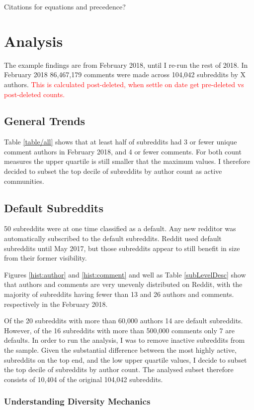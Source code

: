 \documentclass{article}
\begin{document}
Citations for equations and precedence?


\section{Analysis}

The example findings are from February 2018, until I re-run the rest of 2018. In February 2018 86,467,179 comments were made across 104,042 subreddits by X authors. \textcolor{red}{This is calculated post-deleted, when settle on date get pre-deleted vs post-deleted counts.}

\subsection{General Trends}

Table \ref{table/all} shows that at least half of subreddits had 3 or fewer unique comment authors in February 2018, and 4 or fewer comments. For both count measures the upper quartile is still smaller that the maximum values. I therefore decided to subset the top decile of subreddits by author count as active communities.


\subsection{Default Subreddits}
50 subreddits were at one time classified as a default. Any new redditor was automatically subscribed to the default subreddits. Reddit used default subreddits until May 2017, but those subreddits appear to still benefit in size from their former visibility.

Figures \ref{hist:author} and  \ref{hist:comment} and well as Table \ref{subLevelDesc} show that authors and comments are very unevenly distributed on Reddit, with the majority of subreddits having fewer than 13 and 26 authors and comments. respectively in the February 2018.

Of the 20 subreddits with more than 60,000 authors 14 are default subreddits. However, of the 16 subreddits with more than 500,000 comments only 7 are defaults. In order to run the analysis, I was to remove inactive subreddits from the sample. Given the substantial difference between the most highly active, subreddits on the top end, and the low upper quartile values, I decide to subset the top decile of subreddits by author count. The analysed subset therefore consists of 10,404 of the original 104,042 subreddits.


\subsubsection{Understanding Diversity Mechanics}
\end{document}
